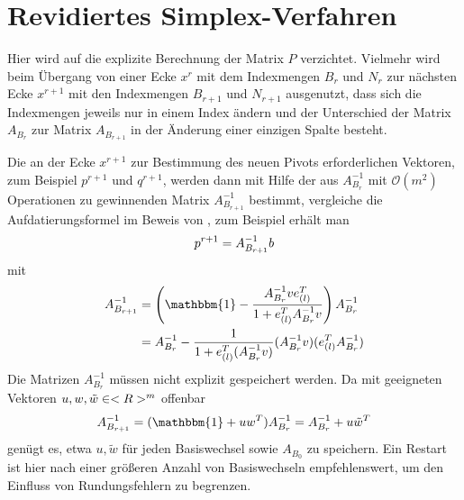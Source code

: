 \section{Revidiertes Simplex-Verfahren}

Hier wird auf die explizite Berechnung der Matrix $P$ verzichtet. Vielmehr wird beim Übergang von einer Ecke $x^r$ mit dem Indexmengen $B_r$ und $N_r$ zur nächsten Ecke $x^{r+1}$ mit den Indexmengen $B_{r+1}$ und $N_{r+1}$ ausgenutzt, dass sich die Indexmengen jeweils nur in einem Index ändern und der Unterschied der Matrix $A_{B_r}$ zur Matrix $A_{B_{r+1}}$ in der Änderung einer einzigen Spalte besteht.

Die an der Ecke $x^{r+1}$ zur Bestimmung des neuen Pivots erforderlichen Vektoren, zum Beispiel $p^{r+1}$ und $q^{r+1}$, werden dann mit Hilfe der aus $A_{B_r}^{-1}$ mit $\mathcal{O}(m^2)$ Operationen zu gewinnenden Matrix $A_{B_{r+1}}^{-1}$ bestimmt, vergleiche die Aufdatierungsformel im Beweis von , zum Beispiel erhält man
\begin{align}
	p^{r+1} = A_{B_{r+1}}^{-1}b\notag
\end{align}
mit
\begin{align}
	A_{B_{r+1}}^{-1} &= \left(\mathbbm{1}-\frac{A_{B_r}^{-1}ve^T_{(l)}}{1+e^T_{(l)}A_{B_r}^{-1}v} \right) A_{B_r}^{-1}\notag \\
	&= A_{B_r}^{-1} - \frac{1}{1+e^T_{(l)}(A_{B_r}^{-1}v)}(A_{B_r}^{-1}v)(e^T_{(l)}A_{B_r}^{-1})\notag
\end{align}
Die Matrizen $A_{B_r}^{-1}$ müssen nicht explizit gespeichert werden. Da mit geeigneten Vektoren $u,w,\tilde{w}\in<R>^m$ offenbar
\begin{align}
	A_{B_{r+1}}^{-1} = (\mathbbm{1}+uw^T)A_{B_r}^{-1} = A_{B_r}^{-1} + u\tilde{w}^T\notag
\end{align}
genügt es, etwa $u,\tilde{w}$ für jeden Basiswechsel sowie $A_{B_0}$ zu speichern. Ein Restart ist hier nach einer größeren Anzahl von Basiswechseln empfehlenswert, um den Einfluss von Rundungsfehlern zu begrenzen.